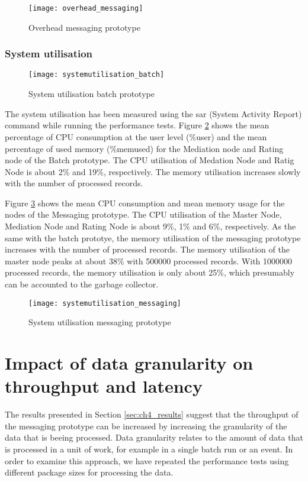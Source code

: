 \begin{figure}[htbp]
	\centering
	\texttt{[image: overhead\_messaging]}
	\caption{Overhead messaging prototype}
	\label{fig:ch4_overhead_messaging}
\end{figure}

\subsubsection{System utilisation}

\begin{figure}[htbp]
	\centering
	\texttt{[image: systemutilisation\_batch]}
	\caption{System utilisation batch prototype}
	\label{fig:ch4_systemutilisation_batch}
\end{figure}

The system utilisation has been measured using the sar (System Activity Report) command while running the performance tests. Figure \ref{fig:ch4_systemutilisation_batch} shows the mean percentage of CPU consumption at the user level (\%user) and the mean percentage of used memory (\%memused) for the Mediation node and Rating node of the Batch prototype.
The CPU utilisation of Medation Node and Ratig Node is about 2\% and 19\%, respectively. The memory utilisation increases slowly with the number of processed records.

Figure \ref{fig:ch4_systemutilisation_messaging} shows the mean CPU consumption and mean memory usage for the nodes of the Messaging prototype. The CPU utilisation of the Master Node, Mediation Node and Rating Node is about 9\%, 1\% and 6\%, respectively.
As the same with the batch prototye, the memory utilisation of the messaging prototype increases with the number of processed records. The memory utilisation of the master node peaks at about 38\% with 500000 processed records.
With 1000000 processed records, the memory utilisation is only about 25\%, which presumably can be accounted to the garbage collector.

\begin{figure}[htbp]
	\centering
	\texttt{[image: systemutilisation\_messaging]}
	\caption{System utilisation messaging prototype}
	\label{fig:ch4_systemutilisation_messaging}
\end{figure}

\section{Impact of data granularity on throughput and latency}\label{sec:ch4_impact_granularity}
The results presented in Section \ref{sec:ch4_results} suggest that the throughput of the messaging prototype can be increased by increasing the granularity of the data that is beeing processed. Data granularity relates to the amount of data that is processed in a unit of work, for example in a single batch run or an event.
In order to examine this approach, we have repeated the performance tests using different package sizes for processing the data.

